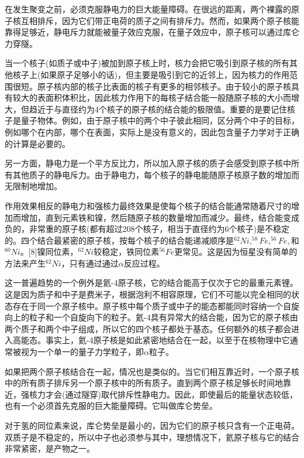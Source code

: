 在发生聚变之前，必须克服静电力的巨大能量障碍。在很远的距离，两个裸露的原子核互相排斥，因为它们带正电荷的质子之间有排斥力。然而，如果两个原子核能靠得足够近，静电斥力就能被量子效应克服，在量子效应中，原子核可以通过库仑力穿隧。

当一个核子(如质子或中子)被加到原子核上时，核力会把它吸引到原子核的所有其他核子上(如果原子足够小的话)，但主要是吸引到它的近邻上，因为核力的作用范围很短。原子核内部的核子比表面的核子有更多的相邻核子。由于较小的原子核具有较大的表面积体积比，因此核力作用下的每核子结合能一般随原子核的大小而增大，但趋近于与直径约为4个核子的原子核的结合能的极限值。重要的是要记住核子是量子物体。例如，由于原子核中的两个中子彼此相同，区分两个中子的目标，例如哪个在内部，哪个在表面，实际上是没有意义的，因此包含量子力学对于正确的计算是必要的。

另一方面，静电力是一个平方反比力，所以加入原子核的质子会感受到原子核中所有其他质子的静电斥力。由于静电力，每个核子的静电能随原子核原子数的增加而无限制地增加。

作用效果相反的静电力和强核力最终效果是使每个核子的结合能通常随着尺寸的增加而增加，直到元素铁和镍，然后随原子核的数量增加而减少。最终，结合能变成负的，非常重的原子核(都有超过208个核子，相当于直径约为6个核子)是不稳定的。四个结合最紧密的原子核，按每个核子的结合能递减顺序是$^{62}Ni,^{58}Fe,^{56}Fe,$和$^{60}Ni$。[8]镍同位素，$^{62}Ni$较稳定，铁同位素$^{56}Fe$更常见。这是因为恒星没有简单的方法来产生$^{62}Ni$，只有通过通过$\alpha$反应过程。

这一普遍趋势的一个例外是氦-4原子核，它的结合能高于仅次于它的最重元素锂。这是因为质子和中子是费米子，根据泡利不相容原理，它们不可能以完全相同的状态存在于同一个原子核中。原子核中每个质子或中子的能态都能同时容纳一个自旋向上的粒子和一个自旋向下的粒子。氦-4具有异常大的结合能，因为它的原子核由两个质子和两个中子组成，所以它的四个核子都处于基态。任何额外的核子都会进入高能态。事实上，氦-4原子核是如此紧密地结合在一起，以至于在核物理中它通常被视为一个单一的量子力学粒子，即$\alpha$粒子。

如果把两个原子核结合在一起，情况也是类似的。当它们相互靠近时，一个原子核中的所有质子排斥另一个原子核中的所有质子。直到两个原子核足够长时间地靠近，强核力才会(通过隧穿)取代排斥性静电力。因此，即使最后的能量状态较低，也有一个必须首先克服的巨大能量障碍。它叫做库仑势垒。

对于氢的同位素来说，库仑势垒是最小的，因为它们的原子核只含有一个正电荷。双质子是不稳定的，所以中子也必须参与其中，理想情况下，氦原子核与它的结合非常紧密，是产物之一。

